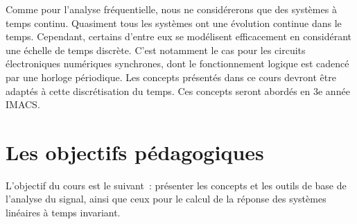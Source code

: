 	Comme pour l'analyse fréquentielle, nous ne considérerons que des systèmes à temps continu. Quasiment tous les systèmes ont une évolution continue dans le temps. Cependant, certains d'entre eux se modélisent efficacement en considérant une échelle de temps discrète. C'est notamment le cas pour les circuits électroniques numériques synchrones, dont le fonctionnement logique est cadencé par une horloge périodique. Les concepts présentés dans ce cours devront être adaptés à cette discrétisation du temps. Ces concepts seront abordés en 3e année IMACS. 
	
	

	
	
	
	\section{Les objectifs pédagogiques}
	L'objectif du cours est le suivant~: présenter les concepts et les outils de base de l'analyse du signal, ainsi que ceux pour le calcul de la réponse des systèmes linéaires à temps invariant.
	
